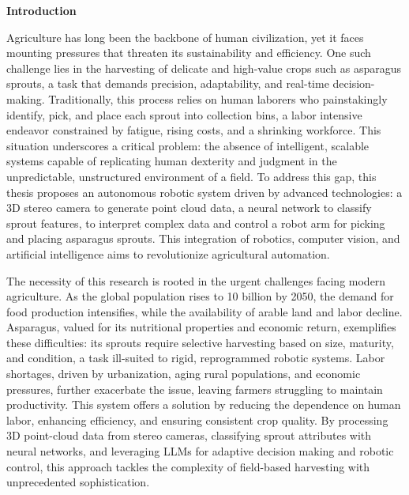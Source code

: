 

{\fontsize{20}{26}\selectfont\textbf{Introduction}}


Agriculture has long been the backbone of human civilization, yet it faces mounting pressures that threaten its sustainability and efficiency. One such challenge lies in the harvesting of delicate and high-value crops such as asparagus sprouts, a task that demands precision, adaptability, and real-time decision-making. Traditionally, this process relies on human laborers who painstakingly identify, pick, and place each sprout into collection bins, a labor intensive endeavor constrained by fatigue, rising costs, and a shrinking workforce. This situation underscores a critical problem: the absence of intelligent, scalable systems capable of replicating human dexterity and judgment in the unpredictable, unstructured environment of a field. To address this gap, this thesis proposes an autonomous robotic system driven by advanced technologies: a 3D stereo camera to generate point cloud data, a neural network to classify sprout features,  to interpret complex data and control a robot arm for picking and placing asparagus sprouts. This integration of robotics, computer vision, and artificial intelligence aims to revolutionize agricultural automation.


The necessity of this research is rooted in the urgent challenges facing modern agriculture. As the global population rises to 10 billion by 2050, the demand for food production intensifies, while the availability of arable land and labor decline. Asparagus, valued for its nutritional properties and economic return, exemplifies these difficulties: its sprouts require selective harvesting based on size, maturity, and condition, a task ill-suited to rigid, reprogrammed robotic systems. Labor shortages, driven by urbanization, aging rural populations, and economic pressures, further exacerbate the issue, leaving farmers struggling to maintain productivity. This system offers a solution by reducing the dependence on human labor, enhancing efficiency, and ensuring consistent crop quality. By processing 3D point-cloud data from stereo cameras, classifying sprout attributes with neural networks, and leveraging LLMs for adaptive decision making and robotic control, this approach tackles the complexity of field-based harvesting with unprecedented sophistication.


